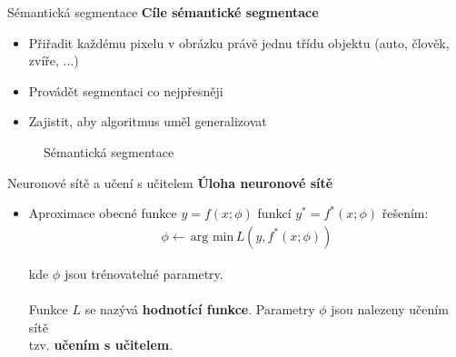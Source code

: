 \documentclass[aspectratio=1610]{beamer}
\begin{document}
\begin{frame}{Sémantická segmentace}
	\textbf{Cíle sémantické segmentace}
	\begin{itemize}
	\item Přiřadit každému pixelu v obrázku právě jednu třídu objektu (auto, člověk, zvíře, ...)
	\item Provádět segmentaci co nejpřesněji
	\item Zajistit, aby algoritmus uměl generalizovat
	\end{itemize}
	\vspace{5mm}		
	\begin{center}
		\begin{figure}
		\caption{Sémantická segmentace}
		\end{figure}	
	\end{center}
\end{frame}
\begin{frame}{Neuronové sítě a učení s učitelem}
	\textbf{Úloha neuronové sítě}
	\begin{itemize}
		\item Aproximace obecné funkce $y=f(x;\phi)$ funkcí $ y^* = f^*(x;\phi)	$ řešením:					
		\begin{gather}
		\phi \leftarrow \, \text{arg min} \, L(y, f^*(x;\phi))	
		\end{gather} 
		 		
		\noindent kde $ \phi $ jsou trénovatelné parametry. \\~\\
		Funkce $ L $ se nazývá \textbf{hodnotící funkce}. Parametry $ \phi $ jsou nalezeny učením sítě \\ tzv. \textbf{učením s učitelem}.
		
	\end{itemize}
\end{frame}
\end{document}
